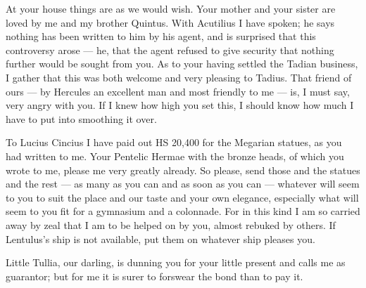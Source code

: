 

 At your house things are as we would wish. Your mother and your sister are loved by me and my brother Quintus. With Acutilius I have spoken; he says nothing has been written to him by his agent, and is surprised that this controversy arose --- he, that the agent refused to give security that nothing further would be sought from you. As to your having settled the Tadian business, I gather that this was both welcome and very pleasing to Tadius. That friend of ours --- by Hercules an excellent man and most friendly to me --- is, I must say, very angry with you. If I knew how high you set this, I should know how much I have to put into smoothing it over.

 To Lucius Cincius I have paid out HS 20,400 for the Megarian statues, as you had written to me. Your Pentelic Hermae with the bronze heads, of which you wrote to me, please me very greatly already. So please, send those and the statues and the rest --- as many as you can and as soon as you can --- whatever will seem to you to suit the place and our taste and your own elegance, especially what will seem to you fit for a gymnasium and a colonnade. For in this kind I am so carried away by zeal that I am to be helped on by you, almost rebuked by others. If Lentulus's ship is not available, put them on whatever ship pleases you.

 Little Tullia, our darling, is dunning you for your little present and calls me as guarantor; but for me it is surer to forswear the bond than to pay it.
